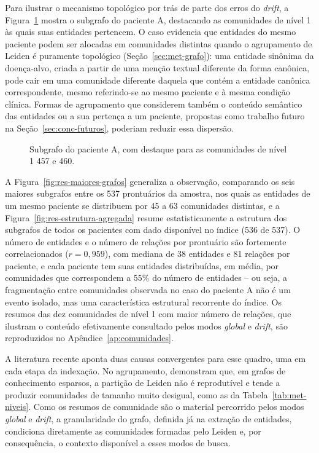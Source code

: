 Para ilustrar o mecanismo topológico por trás de parte dos erros do \textit{drift}, a Figura~\ref{fig:res-subgrafo-paciente-a} mostra o subgrafo do paciente A, destacando as comunidades de nível 1 às quais suas entidades pertencem. O caso evidencia que entidades do mesmo paciente podem ser alocadas em comunidades distintas quando o agrupamento de Leiden é puramente topológico (Seção~\ref{sec:met-grafo}): uma entidade sinônima da doença-alvo, criada a partir de uma menção textual diferente da forma canônica, pode cair em uma comunidade diferente daquela que contém a entidade canônica correspondente, mesmo referindo-se ao mesmo paciente e à mesma condição clínica. Formas de agrupamento que considerem também o conteúdo semântico das entidades ou a sua pertença a um paciente, propostas como trabalho futuro na Seção~\ref{sec:conc-futuros}, poderiam reduzir essa dispersão.

\begin{figure}[!htbp]
\centering
\resizebox{\textwidth}{!}{}
\caption[Subgrafo do paciente A, por comunidade]{Subgrafo do paciente A, com destaque para as comunidades de nível 1 457 e 460.}
\label{fig:res-subgrafo-paciente-a}
\par{}
\end{figure}

A Figura~\ref{fig:res-maiores-grafos} generaliza a observação, comparando os seis maiores subgrafos entre os 537 prontuários da amostra, nos quais as entidades de um mesmo paciente se distribuem por 45 a 63 comunidades distintas, e a Figura~\ref{fig:res-estrutura-agregada} resume estatisticamente a estrutura dos subgrafos de todos os pacientes com dado disponível no índice (536 de 537). O número de entidades e o número de relações por prontuário são fortemente correlacionados ($r=0,959$), com mediana de 38 entidades e 81 relações por paciente, e cada paciente tem suas entidades distribuídas, em média, por comunidades que correspondem a 55\% do número de entidades -- ou seja, a fragmentação entre comunidades observada no caso do paciente A não é um evento isolado, mas uma característica estrutural recorrente do índice. Os resumos das dez comunidades de nível 1 com maior número de relações, que ilustram o conteúdo efetivamente consultado pelos modos \textit{global} e \textit{drift}, são reproduzidos no Apêndice~\ref{ap:comunidades}.

A literatura recente aponta duas causas convergentes para esse quadro, uma em cada etapa da indexação. No agrupamento, \citet{hossain2026} demonstram que, em grafos de conhecimento esparsos, a partição de Leiden não é reprodutível e tende a produzir comunidades de tamanho muito desigual, como as da Tabela~\ref{tab:met-niveis}. Como os resumos de comunidade são o material percorrido pelos modos \textit{global} e \textit{drift}, a granularidade do grafo, definida já na extração de entidades, condiciona diretamente as comunidades formadas pelo Leiden e, por consequência, o contexto disponível a esses modos de busca.

